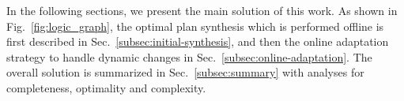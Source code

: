 
In the following sections, we present the main solution of this work.
As shown in Fig.~\ref{fig:logic_graph}, the optimal plan synthesis which is performed offline is first
described in Sec.~\ref{subsec:initial-synthesis},
and then the online adaptation strategy to handle dynamic changes in Sec.~\ref{subsec:online-adaptation}.
The overall solution is summarized in Sec.~\ref{subsec:summary} with analyses
for completeness, optimality and complexity.










